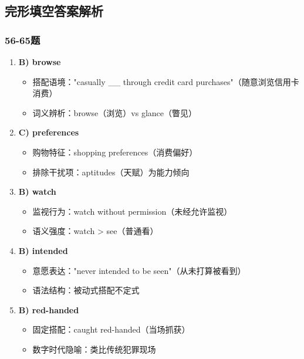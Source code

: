 \documentclass{article}
\begin{document}
%
\subsection*{完形填空答案解析}

\subsubsection*{56-65题}
\begin{enumerate}[label=\textbf{\arabic*.}]
    \item \textbf{B) browse} 
    \begin{itemize}
        \item 搭配语境："casually \_\_ through credit card purchases"（随意浏览信用卡消费）
        \item 词义辨析：browse（浏览）vs glance（瞥见）
    \end{itemize}
    
    \item \textbf{C) preferences} 
    \begin{itemize}
        \item 购物特征：shopping preferences（消费偏好）
        \item 排除干扰项：aptitudes（天赋）为能力倾向
    \end{itemize}
    
    \item \textbf{B) watch} 
    \begin{itemize}
        \item 监视行为：watch without permission（未经允许监视）
        \item 语义强度：watch > see（普通看）
    \end{itemize}
    
    \item \textbf{B) intended} 
    \begin{itemize}
        \item 意愿表达："never intended to be seen"（从未打算被看到）
        \item 语法结构：被动式搭配不定式
    \end{itemize}
    
    \item \textbf{B) red-handed} 
    \begin{itemize}
        \item 固定搭配：caught red-handed（当场抓获）
        \item 数字时代隐喻：类比传统犯罪现场
    \end{itemize}
    

\end{enumerate}
\end{document}

